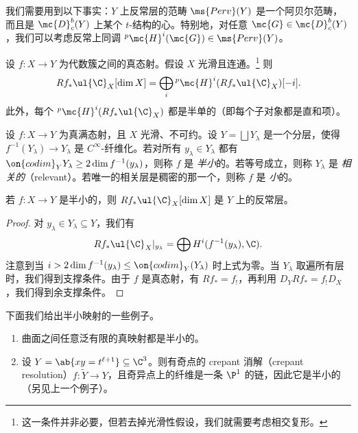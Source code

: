 我们需要用到以下事实：\(Y\) 上反常层的范畴 \(\ms{Perv}(Y)\) 是一个阿贝尔范畴，而且是 \(\mc{D}_c^b(Y)\) 上某个 \(t\)-结构的心。特别地，对任意 \(\mc{G} \in \mc{D}_c^b (Y)\)，我们可以考虑反常上同调 \(^p\mc{H}^i(\mc{G}) \in \ms{Perv}(Y)\)。

\begin{thm}
    设 \(f \colon X \to Y\) 为代数簇之间的真态射。假设 \(X\) 光滑且连通。\footnote{这一条件并非必要，但若去掉光滑性假设，我们就需要考虑相交复形。} 则
    \[ R f_* \ul{\C}_X [\dim X] = \bigoplus_{i} {^p\mc{H}^i}(R f_* \ul{\C}_X)[-i]. \]
    此外，每个 \(^p\mc{H}^i (R f_* \ul{\C}_X)\) 都是半单的（即每个子对象都是直和项）。
\end{thm}

\begin{defn}
    设 \(f \colon X \to Y\) 为真满态射，且 \(X\) 光滑、不可约。设 \(Y = \bigsqcup Y_{\lambda}\) 是一个分层，使得 \(f^{-1}(Y_{\lambda}) \to Y_{\lambda}\) 是 \(C^{\infty}\)-纤维化。若对所有 \(y_{\lambda} \in Y_{\lambda}\) 都有 \(\on{codim}_Y Y_{\lambda} \geq 2 \dim f^{-1} (y_{\lambda})\)，则称 \(f\) 是 \textit{半小}的。若等号成立，则称 \(Y_{\lambda}\) 是 \textit{相关的}（relevant）。若唯一的相关层是稠密的那一个，则称 \(f\) 是 \textit{小}的。
\end{defn}

\begin{thm}
    若 \(f \colon X \to Y\) 是半小的，则 \(R f_* \ul{\C}_X [\dim X]\) 是 \(Y\) 上的反常层。
\end{thm}

\begin{proof}
    对 \(y_{\lambda} \in Y_{\lambda} \subseteq Y\)，我们有
    \[ R f_* \ul{\C}_X |_{y_{\lambda}} = \bigoplus H^i (f^{-1}(y_{\lambda}), \C). \]
    注意到当 \(i > 2 \dim f^{-1}(y_{\lambda}) \leq \on{codim}_Y (Y_{\lambda})\) 时上式为零。当 \(Y_{\lambda}\) 取遍所有层时，我们得到支撑条件。由于 \(f\) 是真态射，有 \(R f_* = f_!\)，再利用 \(D_Y R f_* = f_! D_X\)，我们得到余支撑条件。
\end{proof}

\begin{exms}
    下面我们给出半小映射的一些例子。
    \begin{enumerate}
        \item 曲面之间任意泛有限的真映射都是半小的。
        \item 设 \(Y = \ab\{xy = t^{\ell+1}\} \subseteq \C^3\)。则有奇点的 crepant 消解（crepant resolution）\(f \colon \tilde{Y} \to Y\)，且奇异点上的纤维是一条 \(\P^1\) 的链，因此它是半小的（另见上一个例子）。
    \end{enumerate}
\end{exms}

